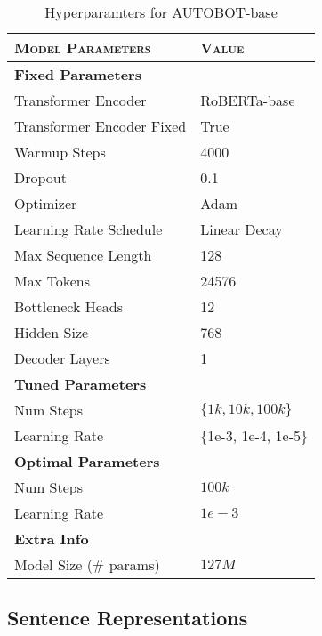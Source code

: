 \begin{table}[h]
    \small
    \centering
    \begin{tabular}{ll}
        \toprule
        \textsc{Model Parameters} & \textsc{Value} \\
        \midrule
        \textbf{Fixed Parameters} & {} \\
        \midrule
        Transformer Encoder & RoBERTa-base \\
        Transformer Encoder Fixed & True \\
        Warmup Steps & 4000 \\
        Dropout & 0.1 \\
        Optimizer & Adam \\
        Learning Rate Schedule & Linear Decay \\
        Max Sequence Length & 128 \\
        Max Tokens & 24576 \\
        Bottleneck Heads & 12 \\
        Hidden Size & 768 \\
        Decoder Layers & 1 \\
        \midrule
        \textbf{Tuned Parameters} & {} \\
        \midrule
        Num Steps & $\{1k, 10k, 100k\}$ \\
        Learning Rate & $\{$1e-3, 1e-4, 1e-5$\}$ \\
        \midrule
        \textbf{Optimal Parameters} & {} \\
        \midrule
        Num Steps & $100k$ \\
        Learning Rate & $1e-3$ \\
        \midrule
        \textbf{Extra Info} & {} \\
        \midrule
        Model Size (\# params) & $127M$ \\
        \bottomrule
    \end{tabular}
    \caption{\label{tab:autobotbase}Hyperparamters for \textsc{AUTOBOT}-base}

\end{table}


\subsection{Sentence Representations}\label{adx:sentrep}

